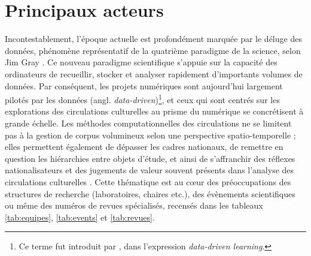 \section{Principaux acteurs}
\label{sect:sota_acteurs} Incontestablement, l'époque actuelle est profondément marquée par le \og{}déluge des données\fg{}, phénomène représentatif de la quatrième paradigme de la science, selon Jim Gray \citep[p.~30]{hey2009jim}. Ce nouveau paradigme scientifique s'appuie sur la capacité des ordinateurs de recueillir, stocker et analyser rapidement d'importants volumes de données. Par conséquent, les projets numériques sont aujourd'hui largement \og{}pilotés par les données (angl. \textit{data-driven})\fg{}\footnote{Ce terme fut introduit par \citet{Johns1991ShouldYB}, dans l'expression \textit{data-driven learning}.}, et ceux qui sont centrés sur les explorations des circulations culturelles au prisme du numérique se concrétisent à grande échelle. Les méthodes computationnelles des circulations ne se limitent pas à la gestion de corpus volumineux selon une perspective spatio-temporelle ; elles permettent également de dépasser les cadres nationaux, de remettre en question les hiérarchies entre objets d’étude, et ainsi de s'affranchir des \og{}réflexes nationalisateurs\fg{} et des \og{}jugements de valeur\fg{} souvent présents dans l'analyse des circulations culturelles \citep[p.~12]{joyeux2022circulations}.
Cette thématique est au c\oe{}ur des préoccupations des structures de recherche (laboratoires, chaires etc.), des évènements scientifiques ou même des numéros de revues spécialisés, recensés dans les tableaux \ref{tab:equipes}, \ref{tab:events} et \ref{tab:revues}.


